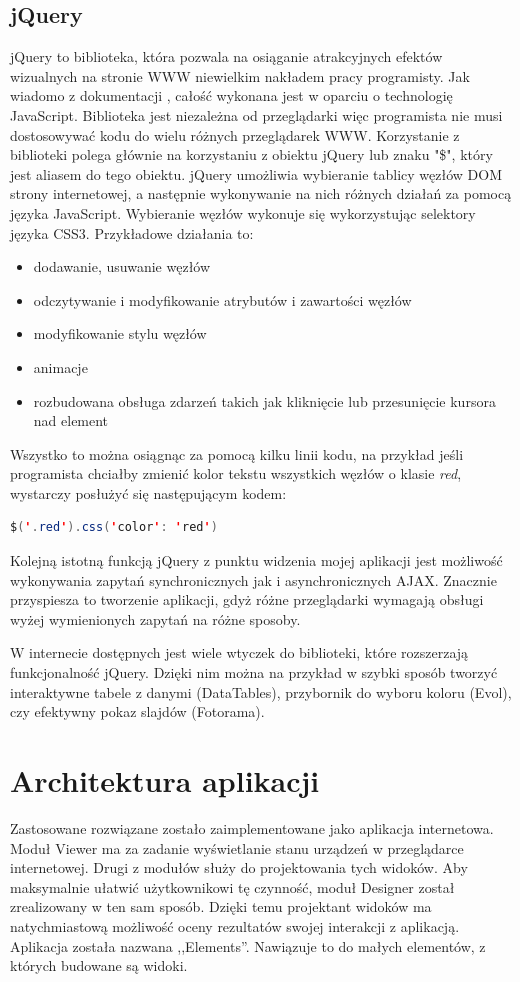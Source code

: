 \subsection{jQuery}
jQuery to biblioteka, która pozwala na osiąganie atrakcyjnych efektów wizualnych na stronie WWW niewielkim nakładem pracy programisty. Jak wiadomo z dokumentacji \cite{jquery-doc}, całość wykonana jest w oparciu o technologię JavaScript. Biblioteka jest niezależna od przeglądarki więc programista nie musi dostosowywać kodu do wielu różnych przeglądarek WWW. Korzystanie z biblioteki polega głównie na korzystaniu z obiektu jQuery lub znaku "\$", który jest aliasem do tego obiektu. jQuery umożliwia wybieranie tablicy węzłów DOM strony internetowej, a następnie wykonywanie na nich różnych działań za pomocą języka JavaScript. Wybieranie węzłów wykonuje się wykorzystując selektory języka CSS3. Przykładowe działania to:
\begin{itemize}
\item dodawanie, usuwanie węzłów
\item odczytywanie i modyfikowanie atrybutów i zawartości węzłów
\item modyfikowanie stylu węzłów
\item animacje
\item rozbudowana obsługa zdarzeń takich jak kliknięcie lub przesunięcie kursora nad element
\end{itemize}
Wszystko to można osiągnąc za pomocą kilku linii kodu, na przykład jeśli programista chciałby zmienić kolor tekstu wszystkich węzłów o klasie \textit{red}, wystarczy posłużyć się następującym kodem:
\begin{lstlisting}[language=Java]
$('.red').css('color': 'red')
\end{lstlisting}
Kolejną istotną funkcją jQuery z punktu widzenia mojej aplikacji jest możliwość wykonywania zapytań synchronicznych jak i asynchronicznych AJAX. Znacznie przyspiesza to tworzenie aplikacji, gdyż różne przeglądarki wymagają obsługi wyżej wymienionych zapytań na różne sposoby. 

W internecie dostępnych jest wiele wtyczek do biblioteki, które rozszerzają funkcjonalność jQuery. Dzięki nim można na przykład w szybki sposób tworzyć interaktywne tabele z danymi (DataTables), przybornik do wyboru koloru (Evol), czy efektywny pokaz slajdów (Fotorama).

\section{Architektura aplikacji}
Zastosowane rozwiązane zostało zaimplementowane jako aplikacja internetowa. Moduł Viewer ma za zadanie wyświetlanie stanu urządzeń w przeglądarce internetowej. Drugi z modułów służy do projektowania tych widoków. Aby maksymalnie ułatwić użytkownikowi tę czynność, moduł Designer został zrealizowany w ten sam sposób. Dzięki temu projektant widoków ma natychmiastową możliwość oceny rezultatów swojej interakcji z aplikacją. Aplikacja została nazwana ,,Elements''. Nawiązuje to do małych elementów, z których budowane są widoki. 

